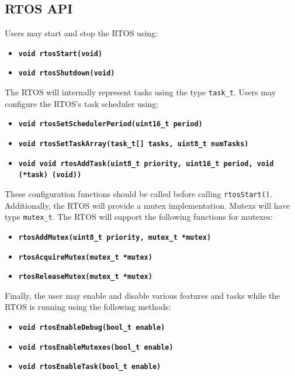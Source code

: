 \documentclass{article}
\newcommand{\bitem}[1]{\item \textbf{#1}}
\begin{document}
	\subsection*{RTOS API}
		
        Users may start and stop the RTOS using:
        \begin{itemize}
            \bitem{\texttt{void rtosStart(void)}}
            \bitem{\texttt{void rtosShutdown(void)}}
        \end{itemize}

        The RTOS will internally represent tasks using the type \texttt{task\_t}. Users may configure the RTOS's task scheduler using:
        \begin{itemize}
            \bitem{\texttt{void rtosSetSchedulerPeriod(uint16\_t period)}}
            \bitem{\texttt{void rtosSetTaskArray(task\_t[] tasks, uint8\_t numTasks)}}
            \bitem{\texttt{void void rtosAddTask(uint8\_t priority, uint16\_t period, void (*task) (void))}}
        \end{itemize}
        These configuration functions should be called before calling \texttt{rtosStart()}. \\


        Additionally, the RTOS will provide a mutex implementation. Mutexs will have type \texttt{mutex\_t}. The RTOS will support the following functions for mutexes:
        \begin{itemize}
            \bitem{\texttt{rtosAddMutex(uint8\_t priority, mutex\_t *mutex)}}
            \bitem{\texttt{rtosAcquireMutex(mutex\_t *mutex)}}
            \bitem{\texttt{rtosReleaseMutex(mutex\_t *mutex)}}
        \end{itemize}

        Finally, the user may enable and disable various features and tasks while the RTOS is running using the following methods:
        \begin{itemize}
            \bitem{\texttt{void rtosEnableDebug(bool\_t enable)}}
            \bitem{\texttt{void rtosEnableMutexes(bool\_t enable)}}
            \bitem{\texttt{void rtosEnableTask(bool\_t enable)}}
        \end{itemize}
		
\end{document}
